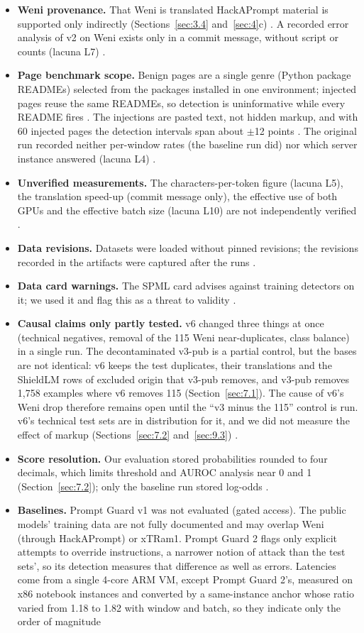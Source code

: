 \documentclass[11pt]{article}
\begin{document}
\begin{itemize}
\item \textbf{Weni provenance.} That Weni is translated HackAPrompt material is supported only indirectly (Sections~\ref{sec:3.4} and~\ref{sec:4}c)%
. A recorded error analysis of v2 on Weni exists only in a commit message, without script or counts (lacuna L7)%
.
\item \textbf{Page benchmark scope.} Benign pages are a single genre (Python package READMEs) selected from the packages installed in one environment; injected pages reuse the same READMEs, so detection is uninformative while every README fires%
. The injections are pasted text, not hidden markup, and with 60 injected pages the detection intervals span about \ensuremath{\pm}12 points%
. The original run recorded neither per-window rates (the baseline run did) nor which server instance answered (lacuna L4)%
.
\item \textbf{Unverified measurements.} The characters-per-token figure (lacuna L5), the translation speed-up (commit message only), the effective use of both GPUs and the effective batch size (lacuna L10) are not independently verified%
.
\item \textbf{Data revisions.} Datasets were loaded without pinned revisions; the revisions recorded in the artifacts were captured after the runs%
.
\item \textbf{Data card warnings.} The SPML card advises against training detectors on it; we used it and flag this as a threat to validity%
.
\item \textbf{Causal claims only partly tested.} v6 changed three things at once (technical negatives, removal of the 115 Weni near-duplicates, class balance) in a single run. The decontaminated v3-pub is a partial control, but the bases are not identical: v6 keeps the test duplicates, their translations and the ShieldLM rows of excluded origin that v3-pub removes, and v3-pub removes 1,758 examples where v6 removes 115 (Section~\ref{sec:7.1}). The cause of v6's Weni drop therefore remains open until the ``v3 minus the 115'' control is run. v6's technical test sets are in distribution for it, and we did not measure the effect of markup (Sections~\ref{sec:7.2} and~\ref{sec:9.3})%
.
\item \textbf{Score resolution.} Our evaluation stored probabilities rounded to four decimals, which limits threshold and AUROC analysis near 0 and 1 (Section~\ref{sec:7.2}); only the baseline run stored log-odds%
.
\item \textbf{Baselines.} Prompt Guard v1 was not evaluated (gated access). The public models' training data are not fully documented and may overlap Weni (through HackAPrompt) or xTRam1. Prompt Guard 2 flags only explicit attempts to override instructions, a narrower notion of attack than the test sets', so its detection measures that difference as well as errors. Latencies come from a single 4-core ARM VM, except Prompt Guard 2's, measured on x86 notebook instances and converted by a same-instance anchor whose ratio varied from 1.18 to 1.82 with window and batch, so they indicate only the order of magnitude%

\end{itemize}
\end{document}
